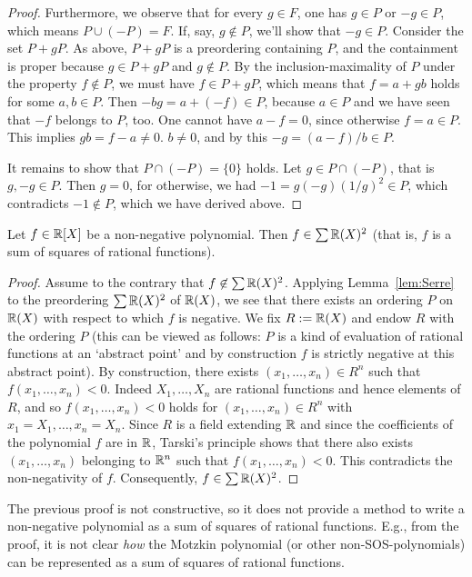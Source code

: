 \begin{proof}
	Furthermore, we observe that for every $g \in F$, one has $g \in P$ or $-g \in P$, which means $P \cup (-P) = F$. 
	If, say, $g \not \in P$, we'll show that $-g \in P$. Consider the set $P + g P$. As above, $P + g P$ is a preordering containing $P$, and the containment is proper because $g \in P+ gP$ and $g \not\in P$. By the inclusion-maximality of $P$ under the property $f \not\in P$, we must have $f \in P + gP$, which means that $f = a + g b$ holds for some $a,b \in P$. Then $ - b g = a + (-f) \in P$, because $a \in P$ and we have seen that $-f$ belongs to $P$, too. One cannot have $a - f= 0 $, since otherwise $f = a \in P$. This implies $g b = f -a  \ne 0$.  $b \ne 0$, and by this $-g = (a-f) / b \in P$. 
	
	It remains to show that $P \cap (-P) = \{0\}$ holds. Let $g \in P \cap (-P)$, that is $g, - g \in P$. Then $g =0$, for otherwise, we had $-1 = g (-g) (1/g)^2 \in P$, which contradicts $-1 \not\in P$, which we have derived above. 
\end{proof}

\begin{theorem}[Artin 1927] Let $f \in \mathbb{R}[X]$ be a non-negative polynomial. Then $f \in \sum \mathbb{R}(X)^2$ (that is, $f$ is a sum of squares of rational functions). 
\end{theorem}
\begin{proof}
	Assume to the contrary that $f \not \in \sum \mathbb{R}(X)^2$. Applying Lemma~\ref{lem:Serre} to the preordering $\sum \mathbb{R}(X)^2$ of $\mathbb{R}(X)$, we see that there exists an ordering $P$ on $\mathbb{R}(X)$ with respect to which $f$ is negative. We fix $R := \mathbb{R}(X)$ and endow $R$ with the ordering $P$ (this can be viewed as follows: $P$ is a kind of evaluation of rational functions at an `abstract point' and by construction $f$ is strictly negative at this abstract point). By construction, there exists $(x_1,\ldots,x_n) \in R^n$ such that $f(x_1,\ldots,x_n) < 0$. Indeed $X_1,\ldots,X_n$ are rational functions and hence elements of $R$, and so $f(x_1,\ldots,x_n) < 0$ holds for $(x_1,\ldots,x_n) \in R^n$ with $x_1=X_1,\ldots,x_n=X_n$. Since $R$ is a field extending $\mathbb{R}$ and since the coefficients of the polynomial $f$ are in $\mathbb{R}$, Tarski's principle  shows that there also exists $(x_1,\ldots,x_n)$ belonging to $\mathbb{R}^n$ such that $f(x_1,\ldots,x_n) < 0$. This contradicts the non-negativity of $f$. Consequently, $f \in \sum \mathbb{R}(X)^2$. 
\end{proof}

\begin{remark}
The previous proof is not constructive, so it does not provide a method to write a non-negative polynomial as a sum of squares of rational functions. E.g., from the proof, it is not clear \emph{how} the Motzkin polynomial (or other non-SOS-polynomials) can be represented as a sum of squares of rational functions. 
\end{remark}

